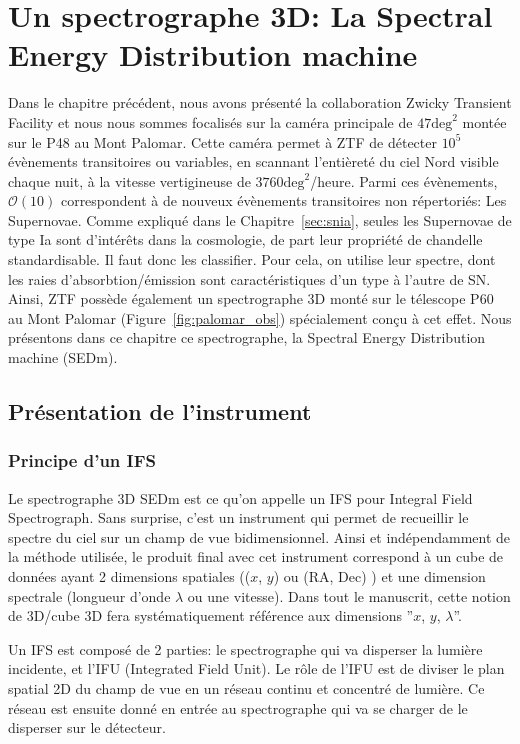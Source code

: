 \documentclass[../main/main.tex]{subfiles}
\begin{document}
\setcounter{chapter}{2}
\chapter{Un spectrographe 3D: La Spectral Energy Distribution machine}\label{ch:sedm}

\minitoc
\vspace{2cm}
Dans le chapitre précédent, nous avons présenté la collaboration Zwicky
Transient Facility et nous nous sommes focalisés sur la caméra
principale de $47\text{deg}^{2}$ montée sur le P48 au Mont
Palomar. Cette caméra permet à ZTF de détecter $10^{5}$ évènements
transitoires ou variables, en scannant l'entièreté du ciel Nord visible
chaque nuit,  à la vitesse
vertigineuse de $3760\text{deg}^{2}$/heure. Parmi ces évènements,
$\mathcal{O}(10)$ correspondent à de nouveux évènements transitoires non
répertoriés: Les Supernovae. Comme expliqué dans le
Chapitre~\ref{sec:snia}, seules les Supernovae de type Ia sont
d'intérêts dans la cosmologie, de part leur propriété de chandelle
standardisable. Il faut donc les classifier. Pour cela, on utilise leur
spectre, dont les raies d'absorbtion/émission sont caractéristiques d'un
type à l'autre de SN. Ainsi, ZTF possède également un spectrographe 3D
monté sur le télescope P60 au Mont Palomar
(Figure~\ref{fig:palomar_obs}) spécialement conçu à cet effet. Nous
présentons dans ce chapitre ce spectrographe, la Spectral Energy
Distribution machine (SEDm).
\newpage

\section{Présentation de l'instrument}
\label{sec:ifs}

\subsection{Principe d'un IFS}
Le spectrographe 3D SEDm est ce qu'on appelle un IFS pour Integral Field
Spectrograph. Sans surprise, c'est un instrument qui permet de
recueillir le spectre du ciel sur un champ de vue bidimensionnel.
Ainsi et indépendamment de la méthode utilisée, le produit final avec
cet instrument correspond à
un cube de données ayant 2 dimensions spatiales (($x$, $y$) ou (RA,
Dec) ) et une dimension spectrale (longueur d'onde $\lambda$ ou une
vitesse). Dans tout le manuscrit, cette notion de 3D/cube 3D fera
systématiquement référence aux dimensions ''$x$, $y$, $\lambda$''.

Un IFS est composé de 2 parties: le spectrographe qui va disperser la
lumière incidente, et l'IFU (Integrated Field Unit). Le rôle de l'IFU
est de diviser le plan spatial 2D du champ de vue en un réseau continu
et concentré de lumière. Ce réseau est ensuite donné en entrée au
spectrographe qui va se charger de le disperser sur le détecteur.
\end{document}
